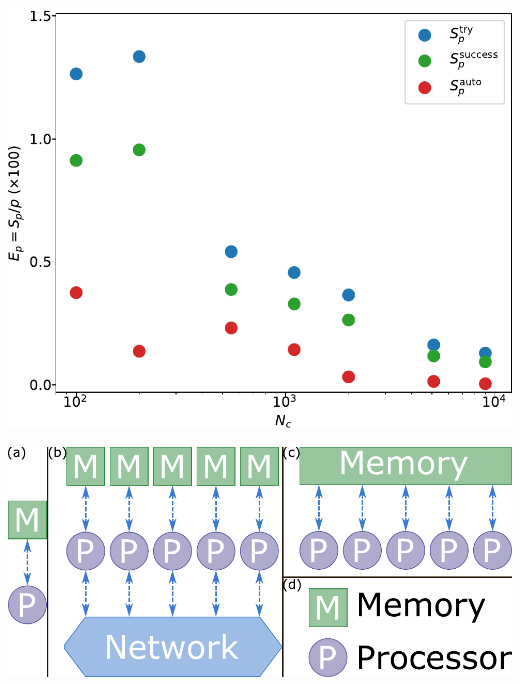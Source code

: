 \documentclass[aspectratio=169]{beamer}
\begin{document}
\begin{frame}[c]{}

  \centering
  \includegraphics[height=\textheight]{../figures/ch3_gpu/fig-speedup_efficiency/fig-speedup.pdf}

\end{frame}

\begin{frame}[c]{}

  \centering
  \includegraphics[width=\textwidth]{../figures/ch3_gpu/fig-CPU_vs_GPU_arch/fig-CPU_vs_GPU_arch.pdf}

\end{frame}
\end{document}
